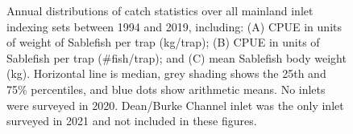 \documentclass[12pt]{article}\usepackage[]{graphicx}\usepackage[]{color}
\begin{document}
\begin{figure}[htb]

{\centering {} 

}

\caption{Annual distributions of catch statistics over all mainland inlet indexing sets between 1994 and 2019, including: (A) CPUE in units of weight of Sablefish per trap (kg/trap); (B) CPUE in units of Sablefish per trap (\#fish/trap); and (C) mean Sablefish body weight (kg). Horizontal line is median, grey shading shows the 25th and 75\% percentiles, and blue dots show arithmetic means. No inlets were surveyed in 2020. Dean/Burke Channel inlet was the only inlet surveyed in 2021 and not included in these figures.}\label{fig:figure11}
\end{figure}
\clearpage
\end{document}
